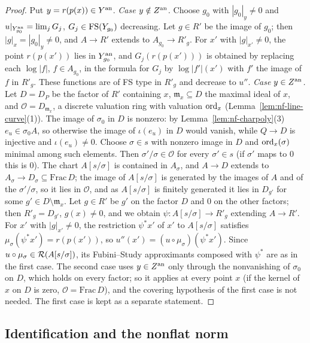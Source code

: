 \begin{proof}
Put $y=r(p(x))\in Y^{\mathrm{an}}$. \emph{Case $y\notin Z^{\mathrm{an}}$.} Choose $g_0$ with $|g_0|_y\ne0$ and
$u|_{Y_{g_0}^{\mathrm{an}}}=\lim_jG_j$, $G_j\in\mathrm{FS}(Y_{g_0})$ decreasing. Let $g\in R'$ be the image of $g_0$; then
$|g|_x=|g_0|_y\ne0$, and $A\to R'$ extends to $A_{g_0}\to R'_g$. For $x'$ with $|g|_{x'}\ne0$, the point $r(p(x'))$ lies
in $Y_{g_0}^{\mathrm{an}}$, and $G_j(r(p(x')))$ is obtained by replacing each $\log|f|$, $f\in A_{g_0}$, in the formula for $G_j$ by
$\log|f'|(x')$ with $f'$ the image of $f$ in $R'_g$. These functions are of FS type in $R'_g$ and decrease to $u''$.
\emph{Case $y\in Z^{\mathrm{an}}$.} Let $D=D_P$ be the factor of $R'$ containing $x$, $\mathfrak m_x\subseteq D$ the maximal ideal
of $x$, and $\mathcal O=D_{\mathfrak m_x}$, a discrete valuation ring with valuation $\operatorname{ord}_x$
(Lemma~\ref{lem:nf-line-curve}(1)). The image of $\sigma_0$ in $D$ is nonzero: by Lemma~\ref{lem:nf-charpoly}(3)
$e_u\in\sigma_0A$, so otherwise the image of $\iota(e_u)$ in $D$ would vanish, while $Q\to D$ is injective and
$\iota(e_u)\ne0$. Choose $\sigma\in s$ with nonzero image in $D$ and $\operatorname{ord}_x(\sigma)$ minimal among such elements. Then
$\sigma'/\sigma\in\mathcal O$ for every $\sigma'\in s$ (if $\sigma'$ maps to $0$ this is $0$). The chart $A[s/\sigma]$ is
contained in $A_\sigma$, and $A\to D$ extends to $A_\sigma\to D_\sigma\subseteq\mathrm{Frac}\,D$; the image of
$A[s/\sigma]$ is generated by the images of $A$ and of the $\sigma'/\sigma$, so it lies in $\mathcal O$, and as
$A[s/\sigma]$ is finitely generated it lies in $D_{g'}$ for some $g'\in D\setminus\mathfrak m_x$. Let $g\in R'$ be $g'$
on the factor $D$ and $0$ on the other factors; then $R'_g=D_{g'}$, $g(x)\ne0$, and we obtain
$\psi\colon A[s/\sigma]\to R'_g$ extending $A\to R'$. For $x'$ with $|g|_{x'}\ne0$, the restriction $\psi^*x'$ of $x'$ to
$A[s/\sigma]$ satisfies $\mu_\sigma(\psi^*x')=r(p(x'))$, so $u''(x')=(u\circ\mu_\sigma)(\psi^*x')$. Since
$u\circ\mu_\sigma\in\mathcal{R}(A[s/\sigma])$, its Fubini--Study approximants composed with $\psi^*$ are as in the first case.
The second case uses $y\in Z^{\mathrm{an}}$ only through the nonvanishing of $\sigma_0$ on $D$, which holds on every factor; so it applies at
every point $x$ (if the kernel of $x$ on $D$ is zero, $\mathcal O=\mathrm{Frac}\,D$), and the covering hypothesis of the first case is not
needed. The first case is kept as a separate statement.
\end{proof}

\subsection{Identification and the nonflat norm}\label{subsec:nf-main}

